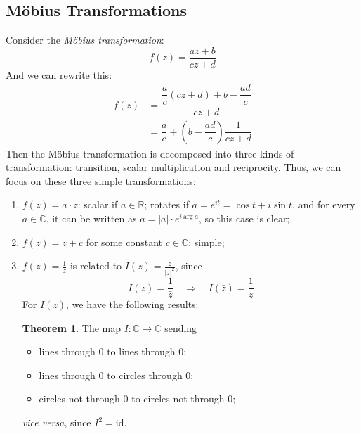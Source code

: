 \documentclass[12pt,reqno]{article}
\newcommand{\R}{\mathbb{R}}
\newcommand{\CC}{\mathbb{C}}
\theoremstyle{definition}
\newtheorem{theorem}{Theorem}[section]
\begin{document}
\subsection{M\"obius Transformations}
Consider the {\it M\"obius transformation}:
\[f(z)=\frac{az+b}{cz+d}\]
And we can rewrite this:
\[\begin{aligned}f(z)&=\dfrac{\dfrac{a}{c}(cz+d)+b-\dfrac{ad}{c}}{cz+d}\\
   &=\dfrac{a}{c}+\left(b-\dfrac{ad}{c}\right)\dfrac{1}{cz+d}\end{aligned}\]
 Then the M\"obius transformation is decomposed into three kinds of transformation: transition, scalar multiplication and reciprocity. Thus, we can focus on these three simple transformations:
 \begin{enumerate}
 \item $f(z)=a\cdot z$: scalar if $a\in \R$; rotates if $a=e^{it}=\cos t+i\sin t$, and for every $a\in \CC$, it can be written as $a=|a|\cdot e^{i~\mathrm{arg}~a}$, so this case is clear;
 \item $f(z)=z+c$ for some constant $c\in \CC$: simple;
 \item $f(z)=\frac{1}{z}$ is related to $I(z)=\frac{z}{|z|^2}$, since 
 \[I(z)=\frac{1}{\bar{z}}\quad \Rightarrow \quad I(\bar{z})=\frac{1}{z} \]
 For $I(z)$, we have the following results:
 \begin{theorem}
 The map $I:\CC\rightarrow \CC$ sending 
 \begin{itemize}
 \item lines through $0$ to lines through $0$;
 \item lines through $0$ to circles through $0$;
 \item circles not through $0$ to circles not through $0$;
 \end{itemize}
 {\it vice versa}, since $I^2=\mathrm{id}$.\end{theorem}
  \end{enumerate}
\end{document}
